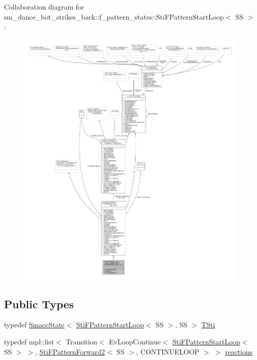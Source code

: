 Collaboration diagram for sm\+\_\+dance\+\_\+bot\+\_\+strikes\+\_\+back\+:\+:f\+\_\+pattern\+\_\+states\+:\+:Sti\+F\+Pattern\+Start\+Loop$<$ SS $>$\+:
\nopagebreak
\begin{figure}[H]
\begin{center}
\leavevmode
\includegraphics[width=350pt]{structsm__dance__bot__strikes__back_1_1f__pattern__states_1_1StiFPatternStartLoop__coll__graph}
\end{center}
\end{figure}
\subsection*{Public Types}
\begin{DoxyCompactItemize}
\item 
typedef \hyperlink{classSmaccState}{Smacc\+State}$<$ \hyperlink{structsm__dance__bot__strikes__back_1_1f__pattern__states_1_1StiFPatternStartLoop}{Sti\+F\+Pattern\+Start\+Loop}$<$ SS $>$, SS $>$ \hyperlink{structsm__dance__bot__strikes__back_1_1f__pattern__states_1_1StiFPatternStartLoop_a3c1089e9485fca72295426898cb9e3d8}{T\+Sti}
\item 
typedef mpl\+::list$<$ Transition$<$ Ev\+Loop\+Continue$<$ \hyperlink{structsm__dance__bot__strikes__back_1_1f__pattern__states_1_1StiFPatternStartLoop}{Sti\+F\+Pattern\+Start\+Loop}$<$ SS $>$ $>$, \hyperlink{structsm__dance__bot__strikes__back_1_1f__pattern__states_1_1StiFPatternForward2}{Sti\+F\+Pattern\+Forward2}$<$ SS $>$, C\+O\+N\+T\+I\+N\+U\+E\+L\+O\+OP $>$ $>$ \hyperlink{structsm__dance__bot__strikes__back_1_1f__pattern__states_1_1StiFPatternStartLoop_a2f2035f8c31ad2fb1e29711013ce79fa}{reactions}
\end{DoxyCompactItemize}
